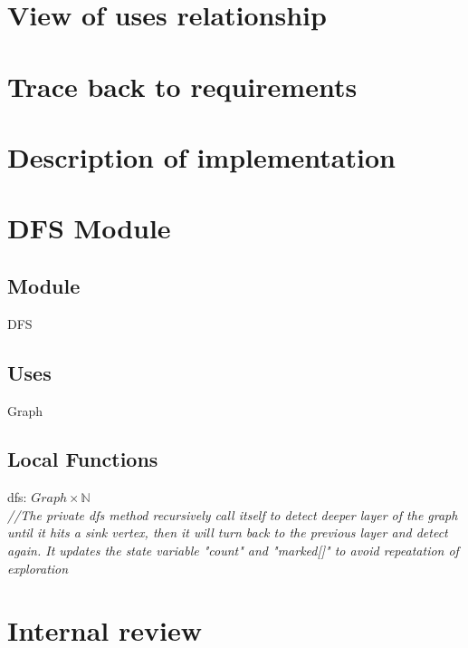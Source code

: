 \documentclass[12pt]{article}
\begin{document}
\section{View of uses relationship}
\section{Trace back to requirements}
\section{Description of implementation}
\section* {DFS Module}

\subsection*{Module}

DFS

\subsection* {Uses}

Graph

\subsection*{Local Functions}

\noindent dfs: $Graph \times \mathbb{N}$\\
\noindent \textit{//The private dfs method recursively call itself to detect deeper layer of the graph until it hits a sink vertex, then it will turn back to the previous layer and detect again. It updates the state variable "count" and "marked[]" to avoid repeatation of exploration}\\

\section{Internal review}
\end{document}

